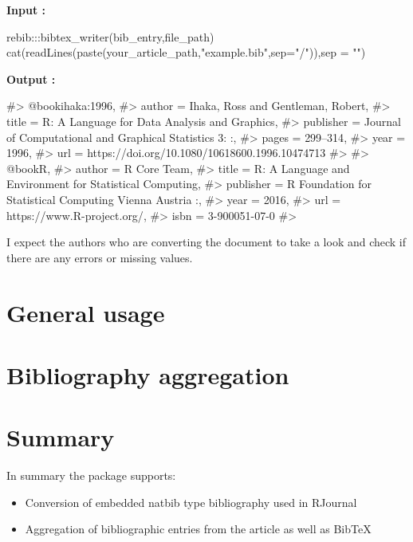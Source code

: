 \begin{Schunk}
 
\textbf{Input :}
\begin{Sinput}
rebib:::bibtex_writer(bib_entry,file_path)
cat(readLines(paste(your_article_path,"example.bib",sep="/")),sep = "\n")
\end{Sinput}
 
\textbf{Output :}
\begin{Soutput}
#> @book{ihaka:1996,
#> author = {{Ihaka, Ross and Gentleman, Robert}},
#> title = {{R: A Language for Data Analysis and Graphics}},
#> publisher = {Journal of Computational and Graphical Statistics 3:   :},
#> pages = {299--314},
#> year = {1996},
#> url = {https://doi.org/10.1080/10618600.1996.10474713}
#> }
#> @book{R,
#> author = {R {Core Team}},
#> title = {{R: A Language and Environment for Statistical Computing}},
#> publisher = {R Foundation for Statistical Computing Vienna Austria    :},
#> year = {2016},
#> url = {https://www.R-project.org/},
#> isbn = {3-900051-07-0}
#> }
\end{Soutput}
\end{Schunk}

I expect the authors who are converting the document to take a look and check if there are any errors or missing values. 



\section{General usage}

\section{Bibliography aggregation}

\section{Summary}

In summary the  package supports:
\begin{itemize}
\item Conversion of embedded natbib type bibliography used in RJournal
\item Aggregation of bibliographic entries from the article as well as BibTeX
\end{itemize}


\address{%
Abhishek Ulayil\\
Student, Institute of Actuaries of India\\%
Mumbai, India\\
ORCiD: 0009-0000-6935-8690\\
}
